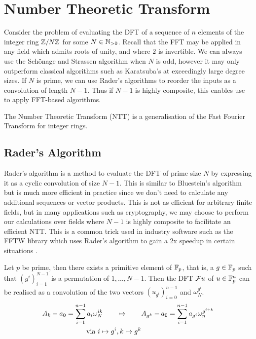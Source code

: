 \section{Number Theoretic Transform}
\label{sec:ntt}


Consider the problem of evaluating the DFT of a sequence of $n$ elements of the integer ring ${\mathbb Z}/N{\mathbb Z}$ for some $N \in {\mathbb N}_{> 0}$. Recall that the FFT may be applied in any field which admits roots of unity, and where $2$ is invertible. We can always use the Sch\"{o}nage and Strassen algorithm when $N$ is odd, however it may only outperform classical algorithms such as Karatsuba's at exceedingly large degree sizes. If $N$ is prime, we can use Rader's algorithms to reorder the inputs as a convolution of length $N-1$. Thus if $N - 1$ is highly composite, this enables use to apply FFT-based algorithms.

The Number Theoretic Transform (NTT) is a generalisation of the Fast Fourier Transform for integer rings.

\subsection{Rader's Algorithm}
\label{subsec:rt}

Rader's algorithm is a method to evaluate the DFT of prime size $N$ by expressing it as a cyclic convolution of size $N - 1$. This is similar to Bluestein's algorithm but is much more efficient in practice since we don't need to calculate any additional sequences or vector products. This is not as efficient for arbitrary finite fields, but in many applications such as cryptography, we may choose to perform our calculations over fields where $N - 1$ is highly composite to facilitate an efficient NTT. This is a common trick used in industry software such as the FFTW library which uses Rader's algorithm to gain a $2$x speedup in certain situations \cite{fftw}.

\begin{definition}\label{thm:rader-transform}
    Let $p$ be prime, then there exists a primitive element of ${\mathbb F}_p$, that is, a $g \in {\mathbb F}_p$ such that $(g^i)_{i=1}^{N-1}$ is a permutation of $1, \ldots, N-1$. Then the DFT $\mathcal Fu$ of $u \in {\mathbb F}_p^n$ can be realised as a convolution of the two vectors $(u_{g^i})_{i=0}^{n-1}$ and $\omega_N^{g^i}$.
    \begin{align*}
        A_k - a_0 = \sum^{n-1}_{i=1} a_i \omega_N^{ik} \qquad &\mapsto \qquad A_{g^k} - a_0 = \sum^{n-1}_{i=1} a_{g^i}\omega_n^{g^{i+k}}\\
        \textrm{ via } i \mapsto g^i&, k \mapsto g^k
    \end{align*}
\end{definition}

